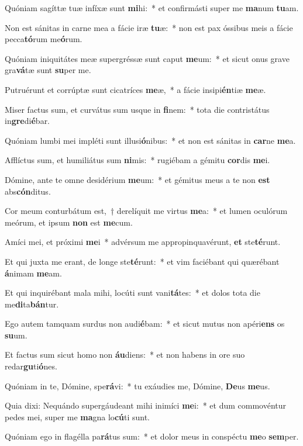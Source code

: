 \item Quóniam sagíttæ tuæ infíxæ sunt \textbf{mi}hi:~* et confirmásti super me \textbf{ma}num \textbf{tu}am.
\item Non est sánitas in carne mea a fácie iræ \textbf{tu}æ:~* non est pax óssibus meis a fácie pecca\textbf{tó}rum me\textbf{ó}rum.
\item Quóniam iniquitátes meæ supergréssæ sunt caput \textbf{me}um:~* et sicut onus grave gra\textbf{vá}tæ sunt \textbf{su}per me.
\item Putruérunt et corrúptæ sunt cicatríces \textbf{me}æ,~* a fácie insipi\textbf{én}tiæ \textbf{me}æ.
\item Miser factus sum, et curvátus sum usque in \textbf{fi}nem:~* tota die contristátus in\textbf{gre}di\textbf{é}bar.
\item Quóniam lumbi mei impléti sunt illusi\textbf{ó}nibus:~* et non est sánitas in \textbf{car}ne \textbf{me}a.
\item Afflíctus sum, et humiliátus sum \textbf{ni}mis:~* rugiébam a gémitu \textbf{cor}dis \textbf{me}i.
\item Dómine, ante te omne desidérium \textbf{me}um:~* et gémitus meus a te non \textbf{est} abs\textbf{cón}ditus.
\item Cor meum conturbátum est,~† derelíquit me virtus \textbf{me}a:~* et lumen oculórum meórum, et ipsum \textbf{non} est \textbf{me}cum.
\item Amíci mei, et próximi \textbf{me}i~* advérsum me appropinquavérunt, \textbf{et} ste\textbf{té}runt.
\item Et qui juxta me erant, de longe ste\textbf{té}runt:~* et vim faciébant qui quærébant \textbf{á}nimam \textbf{me}am.
\item Et qui inquirébant mala mihi, locúti sunt vani\textbf{tá}tes:~* et dolos tota die me\textbf{di}ta\textbf{bán}tur.
\item Ego autem tamquam surdus non audi\textbf{é}bam:~* et sicut mutus non apéri\textbf{ens} os \textbf{su}um.
\item Et factus sum sicut homo non \textbf{áu}diens:~* et non habens in ore suo redar\textbf{gu}ti\textbf{ó}nes.
\item Quóniam in te, Dómine, spe\textbf{rá}vi:~* tu exáudies me, Dómine, \textbf{De}us \textbf{me}us.
\item Quia dixi: Nequándo supergáudeant mihi inimíci \textbf{me}i:~* et dum commovéntur pedes mei, super me \textbf{ma}gna lo\textbf{cú}ti sunt.
\item Quóniam ego in flagélla pa\textbf{rá}tus sum:~* et dolor meus in conspéctu \textbf{me}o \textbf{sem}per.
